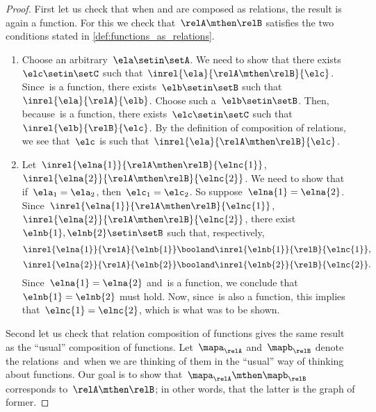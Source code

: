 \begin{proof}
    First let us check that when \relA and \relB are composed as relations, the result is again a function.
    For this we check that~$\relA \mthen \relB$ satisfies the two conditions stated in \cref{def:functions_as_relations}.

    \begin{enumerate}
        \item Choose an arbitrary~$\ela \setin \setA$.
              We need to show that there exists~$\elc \setin \setC$ such that~$\inrel{\ela}{\relA \mthen \relB}{\elc}$.
              Since~\relA is a function, there exists~$\elb \setin \setB$ such that~$\inrel{\ela}{\relA}{\elb}$.
              Choose such a~$\elb \setin \setB$.
              Then, because~\relB is a function, there exists~$\elc \setin \setC$ such that~$\inrel{\elb}{\relB}{\elc}$.
              By the definition of composition of relations, we see that~$\elc$ is such that~$\inrel{\ela}{\relA \mthen \relB}{\elc}$.
        \item Let~$\inrel{\elna{1}}{\relA \mthen \relB}{\elnc{1}}$,~$\inrel{\elna{2}}{\relA \mthen \relB}{\elnc{2}}$.
              We need to show that if~$\ela_1 = \ela_2$, then~$\elc_1 = \elc_2$.
              So suppose~$\elna{1} = \elna{2}$.
              Since~$\inrel{\elna{1}}{\relA \mthen \relB}{\elnc{1}}$,~$\inrel{\elna{2}}{\relA \mthen \relB}{\elnc{2}}$, there exist~$\elnb{1}, \elnb{2} \setin \setB$ such that, respectively,
              \begin{equation}
                  \inrel{\elna{1}}{\relA}{\elnb{1}} \booland \inrel{\elnb{1}}{\relB}{\elnc{1}},
              \end{equation}
              \begin{equation}
                  \inrel{\elna{2}}{\relA}{\elnb{2}} \booland \inrel{\elnb{2}}{\relB}{\elnc{2}}.
              \end{equation}
              Since~$\elna{1} = \elna{2}$ and~\relA is a function, we conclude that~$\elnb{1} = \elnb{2}$ must hold.
              Now, since~\relB is also a function, this implies that~$\elnc{1} = \elnc{2}$, which is what was to be shown.
    \end{enumerate}

    Second let us check that relation composition of functions gives the same result as the ``usual'' composition of functions.
    Let~$\mapa_\relA$ and~$\mapb_\relB$ denote the relations~\relA and~\relB when we are thinking of them in the ``usual'' way of thinking about functions.
    Our goal is to show that~$\mapa_\relA \mthen \mapb_\relB$ corresponds to~$\relA \mthen \relB$; in other words, that the latter is the graph of former.


\end{proof}
